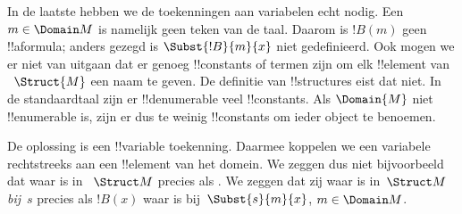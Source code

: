 \documentclass[openany]{memoir}
\begin{document}
\begin{explain}
In de laatste
 hebben we de toekenningen
aan variabelen echt nodig. Een $m \in \Domain M$ is namelijk geen teken
van de taal. Daarom is $!B(m)$ geen !!a{formula}; anders gezegd is
$\Subst{!B}{m}{x}$ niet gedefinieerd. Ook mogen we er niet van uitgaan
dat er genoeg !!{constant}s of termen zijn om elk !!{element} van
~$\Struct{M}$ een naam te geven. De definitie van !!{structure}s eist
dat niet. In de standaardtaal zijn er !!{denumerable} veel
!!{constant}s. Als $\Domain{M}$ niet !!{enumerable} is, zijn er dus te
weinig !!{constant}s om ieder object te benoemen.

De oplossing is een !!{variable} toekenning. Daarmee koppelen we een
variabele rechtstreeks aan een !!{element} van het domein. We zeggen
dus niet bijvoorbeeld dat
 waar is in
~$\Struct M$ precies als . We zeggen dat zij waar is in~$\Struct M$
\emph{bij}~$s$ precies als $!B(x)$ waar is bij~$\Subst{s}{m}{x}$,
 $m \in \Domain M$.
\end{explain}
\end{document}
